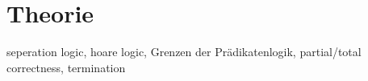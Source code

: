 
\chapter{Theorie}
\label{sec:theorie}
seperation logic, hoare logic, Grenzen der Prädikatenlogik, partial/total
            correctness, termination
